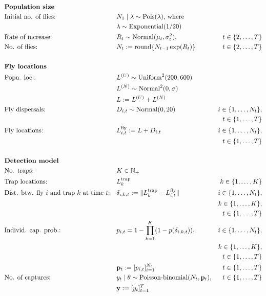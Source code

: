 \documentclass[
]{book}
\begin{document}
\[
\renewcommand{\baselinestretch}{1}\normalsize
\begin{aligned}
&\textbf{Population size} \\
&\text{Initial no. of flies:} && N_1 \mid \lambda \sim \mathrm{Pois}(\lambda) \text{, where} \\
&&& \lambda \sim \mathrm{Exponential}(1/20) \\
& \text{Rate of increase:}~ && R_t \sim \mathrm{Normal}(\mu_t, \sigma^2_t), & t \in \{2, \ldots, T \} \\
& \text{No. of flies:}~ && N_t := \mathrm{round} \{ N_{t-1} \exp(R_t) \}    & t \in \{2, \ldots, T\} \\
\\
&\textbf{Fly locations} \\
& \text{Popn. loc.:}~ && L^{(U)} \sim \mathrm{Uniform}^2(200, 600) \\
&&& L^{(N)} \sim \mathrm{Normal}^2(0, \sigma) \\
&&& L := L^{(U)} + L^{(N)} \\
& \text{Fly dispersals:}~ && D_{i,t} \sim \mathrm{Normal}(0, 20) & i \in \{1, \ldots, N_t\}, \\
  &&&& t \in \{1, \ldots, T\}\\
& \text{Fly locations:}~ && L_{i,t}^\text{fly} := L + D_{i,t} & i \in \{1, \ldots, N_t\}, \\
  &&&& t \in \{1, \ldots, T\}\\
\\
&\textbf{Detection model} \\
& \text{No. traps:}~ && K \in \mathbb N_+ \\
& \text{Trap locations:}~ && L_k^\text{trap} & k \in \{1, \ldots, K\} \\
& \text{Dist. btw. fly } i \text{ and trap } k \text{ at time } t \text{:} && \delta_{i,k,t} := \lVert L_k^\text{trap} - L_{i,t}^\text{fly} \rVert & i \in \{1, \ldots, N_t\}, \\
  &&&& k \in \{1, \ldots, K\}, \\
  &&&& t \in \{1, \ldots, T\}\\
& \text{Individ. cap. prob.:} && p_{i, t} = 1 - \prod_{k=1}^K (1 - p(\delta_{i,k,t})), & i \in \{1, \ldots, N_t\}, \\
  &&&& k \in \{1, \ldots, K\}, \\
  &&&& t \in \{1, \ldots, T\}\\
&  && \mathbf p_t := [p_{i,t}]_{i=1}^{N_t}  & t \in \{1, \ldots, T\} \\
&\text{No. of captures:}~ && y_t \mid \theta \sim \text{Poisson-binomial}(N_t, \mathbf p_t), & t \in \{1, \ldots, T\} \\
  &&& \mathbf y := [y_t]_{t=1}^T
\end{aligned}
\renewcommand{\baselinestretch}{1}\normalsize
\]
\end{document}
